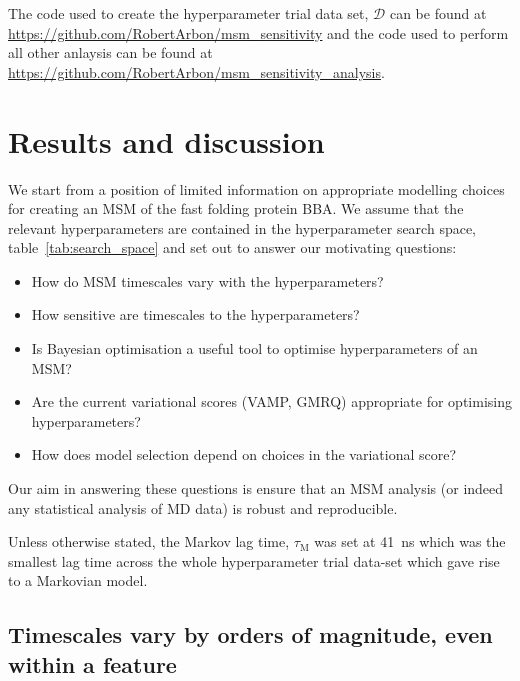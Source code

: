 \documentclass[journal=jacsat,manuscript=article]{achemso}
\begin{document}
The code used to create the hyperparameter trial data set, $\mathcal{D}$ can be found at \url{https://github.com/RobertArbon/msm_sensitivity} and the code used to perform all other anlaysis can be found at \url{https://github.com/RobertArbon/msm_sensitivity_analysis}.  

\section{Results and discussion}

We start from a position of limited information on appropriate modelling choices for creating an MSM of the fast folding protein BBA.  We assume that the
relevant hyperparameters are contained in the  hyperparameter search space, table~\ref{tab:search_space} and set out to answer our motivating questions: 

\begin{itemize}
    \item How do MSM timescales vary with the hyperparameters? 
    \item How sensitive are timescales to the hyperparameters? 
    \item Is Bayesian optimisation a useful tool to optimise hyperparameters of an MSM? 
    \item Are the current variational scores (VAMP, GMRQ) appropriate for optimising hyperparameters? 
    \item How does model selection depend on choices in the variational score? 
\end{itemize}


Our aim in answering these questions is ensure that an MSM analysis (or indeed any statistical analysis of MD data) is robust and reproducible.  

Unless otherwise stated, the Markov lag time, $\tau_{\mathrm{M}}$ was set at \SI{41}{\nano\second} which was the smallest lag time across the whole hyperparameter trial data-set which gave rise to a Markovian model.  

\subsection{Timescales vary by orders of magnitude, even within a feature}
\end{document}
